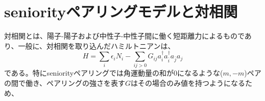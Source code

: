 \documentclass[a4paper]{jsreport}
\begin{document}
  \section{seniorityペアリングモデルと対相関}
  対相関とは、陽子-陽子および中性子-中性子間に働く短距離力によるものであり、一般に、対相関を取り込んだハミルトニアンは、
  \begin{equation}
    H=\sum_{i}\epsilon_i N_i - \sum_{ij>0}G_{ij} a^{\dagger}_{i}a^{\dagger}_{\bar{i}}a_{\bar{j}}a_{j}
  \end{equation}
  である。特にseniorityペアリングでは角運動量の和が0になるような(\(m,-m\))ペアの間で働き、ペアリングの強さを表す\(G\)はその場合のみ値を持つようになるため、
\end{document}
